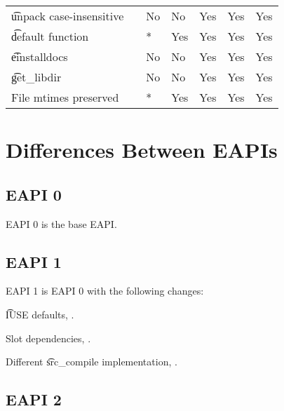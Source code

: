 \begin{landscape}
\begin{longtable}{llP{7.5em}P{7.5em}P{7.5em}P{7.5em}P{7.5em}}
\t{unpack} case-insensitive &  &
    No & No & Yes & Yes & Yes \\

\t{default} function &  &
    * & Yes & Yes & Yes & Yes \\

\t{einstalldocs} &  &
    No & No & Yes & Yes & Yes \\

\t{get_libdir} &  &
    No & No & Yes & Yes & Yes \\

File mtimes preserved &  &
    * & Yes & Yes & Yes & Yes \\

\end{longtable}
\end{landscape}

\chapter{Differences Between EAPIs}


\section{EAPI 0}

EAPI 0 is the base EAPI.

\section{EAPI 1}

EAPI 1 is EAPI 0 with the following changes:

\begin{compactitem}
\item \t{IUSE} defaults, .
\item Slot dependencies, .
\item Different \t{src_compile} implementation, .
\end{compactitem}

\section{EAPI 2}


